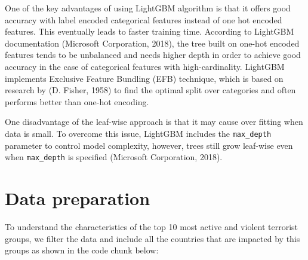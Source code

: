 \documentclass[11pt,oneside,a4paper]{reedthesis}
\newenvironment{Shaded}{\begin{snugshade}}{\end{snugshade}}
\newcommand{\KeywordTok}[1]{\textcolor[rgb]{0.13,0.29,0.53}{\textbf{#1}}}
\newcommand{\DataTypeTok}[1]{\textcolor[rgb]{0.13,0.29,0.53}{#1}}
\newcommand{\DecValTok}[1]{\textcolor[rgb]{0.00,0.00,0.81}{#1}}
\newcommand{\StringTok}[1]{\textcolor[rgb]{0.31,0.60,0.02}{#1}}
\newcommand{\OperatorTok}[1]{\textcolor[rgb]{0.81,0.36,0.00}{\textbf{#1}}}
\newcommand{\NormalTok}[1]{#1}
\begin{document}
One of the key advantages of using LightGBM algorithm is that it offers
good accuracy with label encoded categorical features instead of one hot
encoded features. This eventually leads to faster training time.
According to LightGBM documentation (Microsoft Corporation, 2018), the
tree built on one-hot encoded features tends to be unbalanced and needs
higher depth in order to achieve good accuracy in the case of
categorical features with high-cardinality. LightGBM implements
Exclusive Feature Bundling (EFB) technique, which is based on research
by (D. Fisher, 1958) to find the optimal split over categories and often
performs better than one-hot encoding.

One disadvantage of the leaf-wise approach is that it may cause over
fitting when data is small. To overcome this issue, LightGBM includes
the \texttt{max\_depth} parameter to control model complexity, however,
trees still grow leaf-wise even when \texttt{max\_depth} is specified
(Microsoft Corporation, 2018).

\section{Data preparation}\label{data-preparation-6}

To understand the characteristics of the top 10 most active and violent
terrorist groups, we filter the data and include all the countries that
are impacted by this groups as shown in the code chunk below:
\begin{Shaded}
\end{Shaded}
\end{document}
